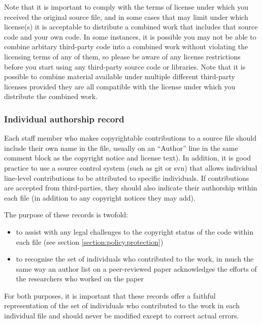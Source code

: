 \documentclass[10pt,a4paper]{article}
\begin{document}
\par Note that it is important to comply with the terms of license under 
which you received the original source file, and in some cases that may limit 
under which license(s) it is acceptable to distribute a combined work that 
includes that source code and your own code. In some instances, it is possible 
you may not be able to combine arbitary third-party code into a combined work 
without violating the licensing terms of any of them, so please be aware of any 
license restrictions before you start using any third-party source code or libraries. 
Note that it is possible to combine material available under multiple different 
third-party licenses provided they are all compatible \cite{define:compatible} with 
the license under which you distribute the combined work. 



\subsubsection{Individual authorship record}
\label{section:impnotes.records}
\par Each staff member who makes copyrightable contributions to a source file 
should include their own name in the file, usually on an ``Author'' line in the 
same comment block as the copyright notice and license text). In addition, it is 
good practice to use a source control system (such as git or svn) that allows 
individual line-level contributions to be attributed to specific individuals. If 
contributions are accepted from third-parties, they should also indicate their 
authorship within each file (in addition to any copyright notices they may add).

\par The purpose of these records is twofold: 
\begin{itemize}
\item to assist with any legal challenges to the copyright status of the code within 
each file (see section \ref{section:policy.protection})
\item to recognise the set of individuals who contributed to the work, in much the 
same way an author list on a peer-reviewed paper acknowledges the efforts of the 
researchers who worked on the paper
\end{itemize}

\par For both purposes, it is important that these records offer a faithful 
representation of the set of individuals who contributed to the work in each 
individual file and should never be modified except to correct actual errors. 
\end{document}
